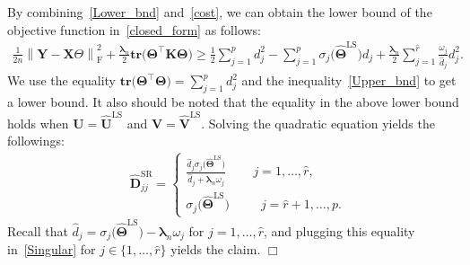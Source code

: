\documentclass[alpha-refs]{wiley-article}
\begin{document}
By combining~\eqref{Lower_bnd} and~\eqref{cost}, we can obtain the lower bound of the objective function in~\eqref{closed_form} as follows:
\begin{align*}
    \frac{1}{2n} \left\| \boldsymbol{Y}-\boldsymbol{X}\Theta \right\|_{\text{F}}^{2} + \frac{\boldsymbol{\lambda}_{n}}{2}
    \textbf{tr}\big(\boldsymbol{\Theta}^{\top} \boldsymbol{K} \boldsymbol{\Theta} \big) \geq
    \frac{1}{2} \sum_{j=1}^{p} d_{j}^2 - \sum_{j=1}^{p} \sigma_{j}\big( \widehat{\boldsymbol{\Theta}}^{\text{LS}} \big)d_{j}  + \frac{\boldsymbol{\lambda}_{n}}{2}\sum_{j=1}^{\widehat{r}} \frac{\omega_{j}}{\widehat{d}_{j}}d_{j}^2.
\end{align*}
We use the equality $\textbf{tr}\big(\boldsymbol{\Theta}^{\top}\boldsymbol{\Theta}\big)=\sum_{j=1}^{p}d_{j}^{2}$ and the inequality~\eqref{Upper_bnd} to get a lower bound.
It also should be noted that the equality in the above lower bound holds when $\boldsymbol{U}=\widehat{\boldsymbol{U}}^{\text{LS}}$ and $\boldsymbol{V}=\widehat{\boldsymbol{V}}^{\text{LS}}$.
Solving the quadratic equation yields the followings:
\begin{align} \label{Singular}
    &\widehat{\boldsymbol{D}}^{\text{SR}}_{jj} =
    \begin{cases}
        \frac{\widehat{d}_{j}\sigma_{j}\big(\widehat{\boldsymbol{\Theta}}^{\text{LS}} \big) }{\widehat{d}_{j} + \boldsymbol{\lambda}_{n}\omega_{j}}
        \qquad \, j = 1,\dots,\widehat{r}, \\
        \sigma_{j}\big(\widehat{\boldsymbol{\Theta}}^{\text{LS}} \big)
        \qquad \,\,\, j = \widehat{r}+1,\dots,p.
    \end{cases}
\end{align}
Recall that $\widehat{d}_{j}=\sigma_{j}\big(\widehat{\boldsymbol{\Theta}}^{\text{LS}} \big)-\boldsymbol{\lambda}_{n}\omega_{j}$ for $j=1,\dots,\widehat{r}$,
and plugging this equality in~\eqref{Singular} for $j\in\{1,\dots,\widehat{r}\}$ yields the claim.
$\Box$
\end{document}
